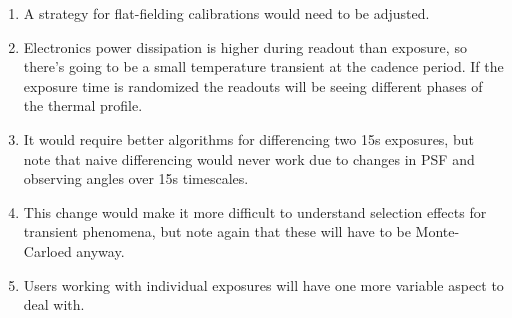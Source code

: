 \documentclass[12pt, a4paper]{article}
\begin{document}
\begin{enumerate}

\item A strategy for flat-fielding calibrations would need to be
  adjusted.

\item Electronics power dissipation is higher during readout than
  exposure, so there's going to be a small temperature transient at
  the cadence period. If the exposure time is randomized the readouts
  will be seeing different phases of the thermal profile.


\item It would require better algorithms for differencing two 15s
  exposures, but note that naive differencing would never work due to
  changes in PSF and observing angles over 15s timescales.

\item This change would make it more difficult to understand selection
  effects for transient phenomena, but note again that these will have
  to be Monte-Carloed anyway.

\item Users working with individual exposures will have one more
  variable aspect to deal with.



\end{enumerate}
\end{document}
